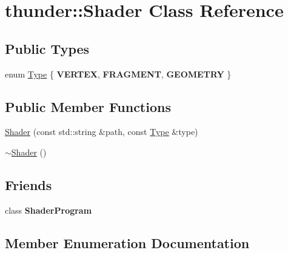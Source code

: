 \hypertarget{classthunder_1_1_shader}{}\section{thunder\+:\+:Shader Class Reference}
\label{classthunder_1_1_shader}
\subsection*{Public Types}
\begin{DoxyCompactItemize}
\item 
enum \mbox{\hyperlink{classthunder_1_1_shader_a813fdb14b81f9dbb161c3e8deccb28f6}{Type}} \{ {\bfseries V\+E\+R\+T\+EX}, 
{\bfseries F\+R\+A\+G\+M\+E\+NT}, 
{\bfseries G\+E\+O\+M\+E\+T\+RY}
 \}
\end{DoxyCompactItemize}
\subsection*{Public Member Functions}
\begin{DoxyCompactItemize}
\item 
\mbox{\hyperlink{classthunder_1_1_shader_ad79fcbdab7b64ba8626771b7b1800cb8}{Shader}} (const std\+::string \&path, const \mbox{\hyperlink{classthunder_1_1_shader_a813fdb14b81f9dbb161c3e8deccb28f6}{Type}} \&type)
\item 
\mbox{\hyperlink{classthunder_1_1_shader_a866c0215ed5d2cd015349c1a0850671c}{$\sim$\+Shader}} ()
\end{DoxyCompactItemize}
\subsection*{Friends}
\begin{DoxyCompactItemize}
\item 
\mbox{\label{classthunder_1_1_shader_aef20119bde6aff11ffd23f3ea2131b86}} 
class {\bfseries Shader\+Program}
\end{DoxyCompactItemize}


\subsection{Member Enumeration Documentation}
\mbox{\label{classthunder_1_1_shader_a813fdb14b81f9dbb161c3e8deccb28f6}} 
